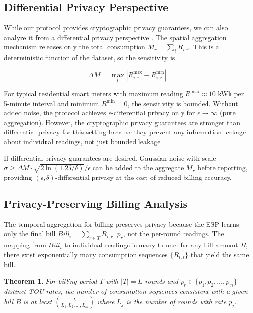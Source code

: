 \documentclass[conference]{IEEEtran}
\newtheorem{theorem}{Theorem}
\begin{document}
\subsection{Differential Privacy Perspective}

While our protocol provides cryptographic privacy guarantees, we can also analyze it from a differential privacy perspective \cite{dwork2006differential}. The spatial aggregation mechanism releases only the total consumption \(M_r = \sum_i R_{i,r}\). This is a deterministic function of the dataset, so the sensitivity is

\begin{equation}
\Delta M = \max_{i} |R_{i,r}^{\max} - R_{i,r}^{\min}|
\end{equation}

For typical residential smart meters with maximum reading \(R^{\max} \approx 10\) kWh per 5-minute interval and minimum \(R^{\min} = 0\), the sensitivity is bounded. Without added noise, the protocol achieves \(\epsilon\)-differential privacy only for \(\epsilon \to \infty\) (pure aggregation). However, the cryptographic privacy guarantees are stronger than differential privacy for this setting because they prevent any information leakage about individual readings, not just bounded leakage.

If differential privacy guarantees are desired, Gaussian noise with scale \(\sigma \geq \Delta M \cdot \sqrt{2\ln(1.25/\delta)}/\epsilon\) can be added to the aggregate \(M_r\) before reporting, providing \((\epsilon,\delta)\)-differential privacy at the cost of reduced billing accuracy.

\subsection{Privacy-Preserving Billing Analysis}

The temporal aggregation for billing preserves privacy because the ESP learns only the final bill \(Bill_i = \sum_{r \in T} R_{i,r} \cdot p_r\), not the per-round readings. The mapping from \(Bill_i\) to individual readings is many-to-one: for any bill amount \(B\), there exist exponentially many consumption sequences \(\{R_{i,r}\}\) that yield the same bill.

\begin{theorem}
For billing period \(T\) with \(|T| = L\) rounds and \(p_r \in \{p_1, p_2, \ldots, p_m\}\) distinct TOU rates, the number of consumption sequences consistent with a given bill \(B\) is at least \(\binom{L}{L_1, L_2, \ldots, L_m}\) where \(L_j\) is the number of rounds with rate \(p_j\).
\end{theorem}
\end{document}
